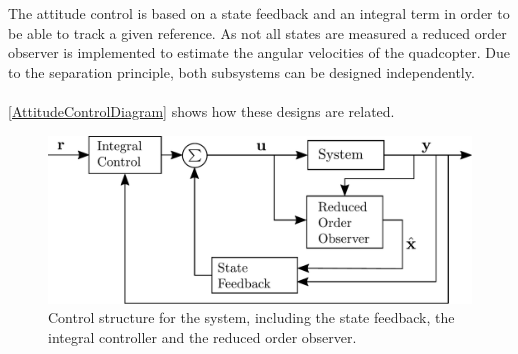 The attitude control is based on a state feedback and an integral term in order to be able to track a given reference. As not all states are measured a reduced order observer is implemented to estimate the angular velocities of the quadcopter. Due to the separation principle, both subsystems can be designed independently. \cite{ssReference}
\\
\\
\noindent\autoref{AttitudeControlDiagram} shows how these designs are related.
\begin{figure}[H]
    \centering
    \includegraphics[width=.4\textwidth]{figures/AttitudeControlDiagram}
    \caption{ Control structure for the system, including the state feedback, the integral controller and the reduced order observer.}
    \label{AttitudeControlDiagram}
\end{figure}

